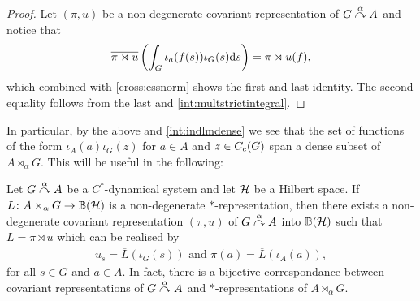 \begin{proof}
Let $(\pi, u)$ be a non-degenerate covariant representation of $G \stackrel{\alpha}{\curvearrowright} A$ and notice that
\begin{align*}
	\overline{\pi \rtimes u}\left( \int_G \iota_a(f(s)) \iota_G(s) \mathrm{d} s  \right) = \pi \rtimes u (f),
\end{align*}
which combined with \cref{cross:essnorm} shows the first and last identity. The second equality follows from the last and  \cref{int:multstrictintegral}.
\end{proof}
\begin{remark}
In particular, by the above and \cref{int:indlmdense} we see that the set of functions of the form $\iota_A(a) \iota_G(z)$ for $a \in A$ and $z \in C_c(G)$ span a dense subset of $A \rtimes_\alpha G$. This will be useful in the following:
\end{remark}
\begin{theorem}
Let $G \stackrel{\alpha}{\curvearrowright} A$ be a $C ^*$-dynamical system and let $\mathcal{H}$ be a Hilbert space. If $L \colon A \rtimes_\alpha G \to \mathbb{B}(\mathcal{H})$ is a non-degenerate $*$-representation, then there exists a non-degenerate covariant representation $(\pi,u)$ of $G \stackrel{\alpha}{\curvearrowright} A$ into $ \mathbb{B}(\mathcal{H})$ such that $L= \pi \rtimes u$ which can be realised by 
\begin{align*}
	u_s = \overline L(\iota_G(s)) \text{ and } \pi(a) = \overline L(\iota_A(a)),
\end{align*}
for all $s \in G$ and $a \in A$. In fact, there is a bijective correspondance between covariant representations of $G \stackrel{\alpha}{\curvearrowright} A$ and $*$-representations of $A \rtimes_\alpha G$.
\label{cross:onetoonecor}
\end{theorem}

